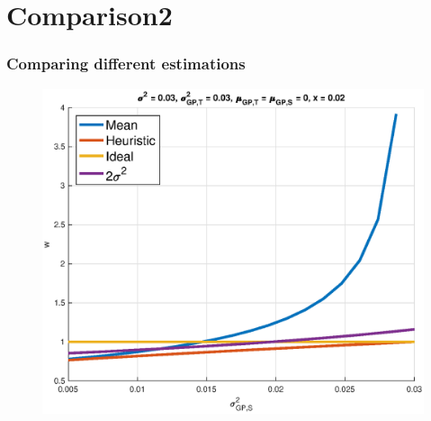 \documentclass[professionalfont]{beamer}
\begin{document}
    \section{Comparison2}
      \begin{frame}
      \frametitle{Comparing different estimations}
        \begin{figure}
          \includegraphics[scale=0.5]{images/comparison2.eps}
          \caption{}
          \label{}
        \end{figure}
      \end{frame}
\end{document}
